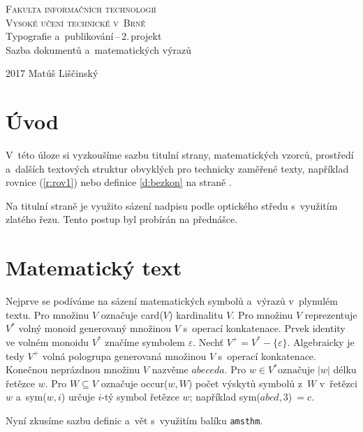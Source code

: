 \documentclass[11pt,a4paper,twocolumn,titlepage]{article}
\begin{document}
\begin{titlepage}
\begin{center}
{\Huge\textsc{Fakulta informačních technologií}} \\
\smallskip
{\Huge\textsc{Vysoké učení technické v~Brně}}	\\
{\LARGE{Typografie a~publikování\,--\,2.\,projekt}} \\ 
\smallskip
{\LARGE{Sazba dokumentů a~matematických výrazů}} \\
\end{center}
{\Large {2017} \hfill {Matúš Liščinský}}
\end{titlepage}

\theoremstyle{definition}
\newtheorem{definition}{Definice}[section]
\newtheorem{algorithm}[definition]{Algoritmus}
\theoremstyle{plain}
\newtheorem{sentence}{Věta}

\section *{Úvod}
V~této úloze si vyzkoušíme sazbu titulní strany, matematických vzorců, prostředí a~dalších textových struktur obvyklých pro technicky zaměřené texty, například rovnice (\ref{r:rov1}) nebo definice \ref{d:bezkon} na straně \pageref{d:bezkon}.

Na titulní straně je využito sázení nadpisu podle optického středu s~využitím zlatého řezu. Tento postup byl probírán na přednášce.

\section {Matematický text}
Nejprve se podíváme na sázení matematických symbolů a~výrazů v~plynulém textu. Pro množinu $V$ označuje card($V$) kardinalitu $V$.
Pro množinu $V$ reprezentuje $V^*$ volný monoid generovaný množinou $V$ s~operací konka\-tenace.
Prvek identity ve volném monoidu $V^*$ značíme symbolem $\varepsilon$. Nechť $V^+ = V^* - \{\varepsilon\}$.
Algebraicky je tedy $V^+$ volná pologrupa generovaná množinou $V$ s~operací konkatenace. Konečnou neprázdnou množinu $V$ nazvěme $abeceda$. 
Pro $w \in V^* \mbox{označuje } |w|$ délku řetězce $w$. Pro $W \subseteq V$ označuje occur($w, W$) počet výskytů symbolů z~$W$ v~řetězci $w$ a~sym($w, i$) určuje $i$-tý symbol řetězce $w$; například sym($abcd,3$)$\ = c$.

Nyní zkusíme sazbu definic a~vět s~využitím balíku \texttt{amsthm}.
\end{document}
